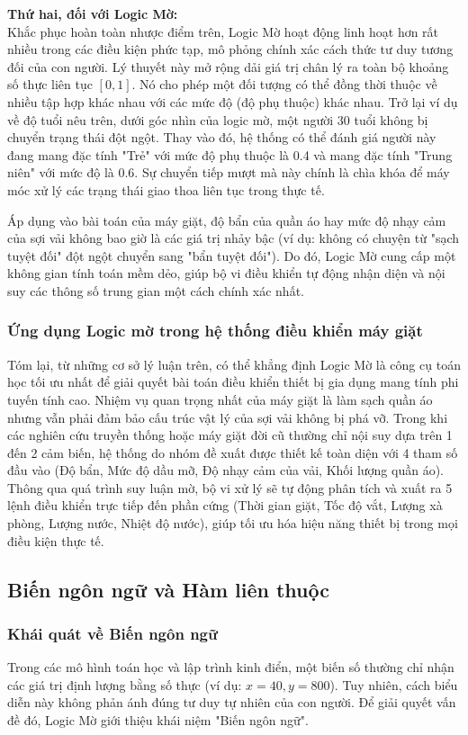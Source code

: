 \documentclass[12pt, a4paper]{article}
\begin{document}
\textbf{Thứ hai, đối với Logic Mờ:}\\
Khắc phục hoàn toàn nhược điểm trên, Logic Mờ hoạt động linh hoạt hơn rất nhiều trong các điều kiện phức tạp, mô phỏng chính xác cách thức tư duy tương đối của con người. Lý thuyết này mở rộng dải giá trị chân lý ra toàn bộ khoảng số thực liên tục $[0, 1]$. Nó cho phép một đối tượng có thể đồng thời thuộc về nhiều tập hợp khác nhau với các mức độ (độ phụ thuộc) khác nhau. Trở lại ví dụ về độ tuổi nêu trên, dưới góc nhìn của logic mờ, một người 30 tuổi không bị chuyển trạng thái đột ngột. Thay vào đó, hệ thống có thể đánh giá người này đang mang đặc tính "Trẻ" với mức độ phụ thuộc là 0.4 và mang đặc tính "Trung niên" với mức độ là 0.6. Sự chuyển tiếp mượt mà này chính là chìa khóa để máy móc xử lý các trạng thái giao thoa liên tục trong thực tế.

Áp dụng vào bài toán của máy giặt, độ bẩn của quần áo hay mức độ nhạy cảm của sợi vải không bao giờ là các giá trị nhảy bậc (ví dụ: không có chuyện từ "sạch tuyệt đối" đột ngột chuyển sang "bẩn tuyệt đối"). Do đó, Logic Mờ cung cấp một không gian tính toán mềm dẻo, giúp bộ vi điều khiển tự động nhận diện và nội suy các thông số trung gian một cách chính xác nhất.

\subsubsection{Ứng dụng Logic mờ trong hệ thống điều khiển máy giặt}
Tóm lại, từ những cơ sở lý luận trên, có thể khẳng định Logic Mờ là công cụ toán học tối ưu nhất để giải quyết bài toán điều khiển thiết bị gia dụng mang tính phi tuyến tính cao. Nhiệm vụ quan trọng nhất của máy giặt là làm sạch quần áo nhưng vẫn phải đảm bảo cấu trúc vật lý của sợi vải không bị phá vỡ. Trong khi các nghiên cứu truyền thống hoặc máy giặt đời cũ thường chỉ nội suy dựa trên 1 đến 2 cảm biến, hệ thống do nhóm đề xuất được thiết kế toàn diện với 4 tham số đầu vào (Độ bẩn, Mức độ dầu mỡ, Độ nhạy cảm của vải, Khối lượng quần áo). Thông qua quá trình suy luận mờ, bộ vi xử lý sẽ tự động phân tích và xuất ra 5 lệnh điều khiển trực tiếp đến phần cứng (Thời gian giặt, Tốc độ vắt, Lượng xà phòng, Lượng nước, Nhiệt độ nước), giúp tối ưu hóa hiệu năng thiết bị trong mọi điều kiện thực tế.

\subsection{Biến ngôn ngữ và Hàm liên thuộc}
\subsubsection{Khái quát về Biến ngôn ngữ}
Trong các mô hình toán học và lập trình kinh điển, một biến số thường chỉ nhận các giá trị định lượng bằng số thực (ví dụ: $x = 40, y = 800$). Tuy nhiên, cách biểu diễn này không phản ánh đúng tư duy tự nhiên của con người. Để giải quyết vấn đề đó, Logic Mờ giới thiệu khái niệm "Biến ngôn ngữ".
\end{document}
